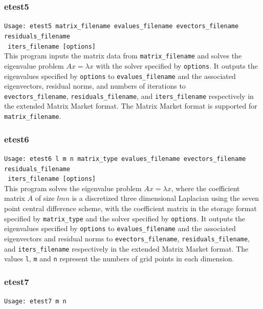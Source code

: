 \documentclass[a4paper]{article}
\begin{document}
\subsubsection{etest5}

\verb+Usage: etest5 matrix_filename evalues_filename evectors_filename residuals_filename +\\
\verb+ iters_filename [options] +\\

This program inputs the matrix data from {\tt matrix\_filename} and
solves the eigenvalue problem $Ax=\lambda x$ with
the solver specified by {\tt options}. 
It outputs the eigenvalues specified by {\tt options} to 
{\tt evalues\_filename} and the associated 
eigenvectors, residual norms, and numbers of iterations  
to \\ {\tt evectors\_filename}, {\tt residuals\_filename}, 
and {\tt iters\_filename} respectively in the extended 
Matrix Market format. The Matrix Market format is supported for 
{\tt matrix\_filename}. 

\subsubsection{etest6}

\verb+Usage: etest6 l m n matrix_type evalues_filename evectors_filename residuals_filename +\\
\verb+ iters_filename [options] +\\

This program solves the eigenvalue problem $Ax = \lambda x$, where the 
coefficient matrix $A$ of size $lmn$ is a discretized three dimensional Laplacian using the seven
point central difference scheme, with the coefficient matrix in the storage format specified
by \verb|matrix_type| and the solver specified by {\tt options}. 
It outputs the eigenvalues specified by {\tt options} to 
{\tt evalues\_filename} and the associated 
eigenvectors and residual norms to {\tt evectors\_filename},  
{\tt residuals\_filename}, and {\tt iters\_filename} respectively 
in the extended Matrix Market format.
The values {\tt l}, {\tt m} and {\tt n} represent the numbers of grid
points in each dimension.

\subsubsection{etest7}

\verb+Usage: etest7 m n+\\
\end{document}
